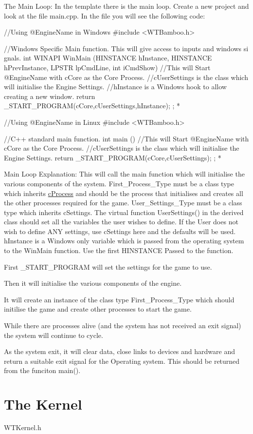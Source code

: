 The Main Loop: In the template there is the main loop. Create a new project and look at the file main.cpp. In the file you will see the following code: 
\begin{DoxyCode}
 //Using @EngineName in Windows
 #include <WTBamboo.h>

 //Windows Specific Main function. This will give access to inputs and windows si
      gnals.
 int WINAPI WinMain (HINSTANCE hInstance,
                    HINSTANCE hPrevInstance,
                    LPSTR lpCmdLine,
                    int iCmdShow)
 {
 //This will Start @EngineName with cCore as the Core Process.
 //cUserSettings is the class which will initialise the Engine Settings.
 //hInstance is a Windows hook to allow creating a new window.
 return _START_PROGRAM(cCore,cUserSettings,hInstance);
};
*
\end{DoxyCode}
 
\begin{DoxyCode}
 //Using @EngineName in Linux
 #include <WTBamboo.h>

 //C++ standard main function.
 int main ()
 {
 //This will Start @EngineName with cCore as the Core Process.
 //cUserSettings is the class which will initialise the Engine Settings.
  return _START_PROGRAM(cCore,cUserSettings);
 };
*
\end{DoxyCode}


Main Loop Explanation: This will call the main function which will initialise the various components of the system. First\_\-Process\_\-Type must be a class type which inherits \hyperlink{classc_process}{cProcess} and should be the process that initialises and creates all the other processes required for the game. User\_\-Settings\_\-Type must be a class type which inherits cSettings. The virtual function UserSettings() in the derived class should set all the variables the user wishes to define. If the User does not wish to define ANY settings, use cSettings here and the defaults will be used. hInstance is a Windows only variable which is passed from the operating system to the WinMain function. Use the first HINSTANCE Passed to the function.\par
 First \_\-START\_\-PROGRAM will set the settings for the game to use.\par
 Then it will initialise the various components of the engine.\par
 It will create an instance of the class type First\_\-Process\_\-Type which should initilise the game and create other processes to start the game.\par
 While there are processes alive (and the system has not received an exit signal) the system will continue to cycle.\par
 As the system exit, it will clear data, close links to devices and hardware and return a suitable exit signal for the Operating system. This should be returned from the funciton main().\par
\hypertarget{_using_engine_page_KernelPage}{}\section{The Kernel}\label{_using_engine_page_KernelPage}
WTKernel.h


